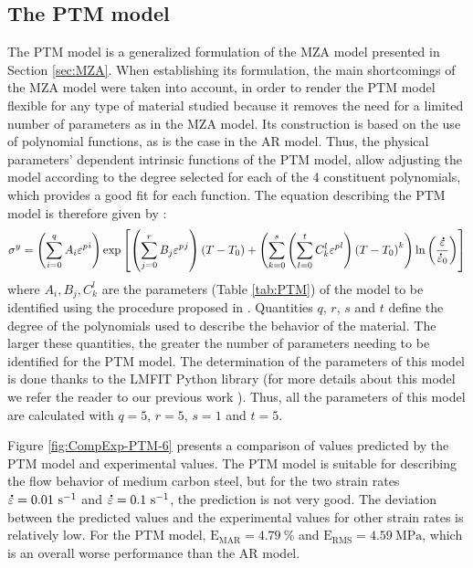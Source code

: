 \documentclass[metals,article,submit,pdftex,moreauthors]{Definitions/mdpi}
\DeclareRobustCommand{\mdot}[1]{\accentset{\mbox{\bfseries .}}{#1}}
\DeclareRobustCommand{\RMSE}{\text{E}_\text{RMS}}
\DeclareRobustCommand{\MARE}{\text{E}_\text{MAR}}
\DeclareRobustCommand{\ps}{\text{s}^{-1}}
\DeclareRobustCommand{\MPa}{\text{MPa}}
\begin{document}
\subsection{The PTM model\label{sec:PTM}}

The PTM model \cite{TizeMha-2022} is a generalized formulation of the MZA model presented in Section \ref{sec:MZA}.
When establishing its formulation, the main shortcomings of the MZA model were taken into account, in order to render the PTM model flexible for any type of material studied because it removes the need for a limited number of parameters as in the MZA model.
Its construction is based on the use of polynomial functions, as is the case in the AR model.
Thus, the physical parameters' dependent intrinsic functions of the PTM model, allow adjusting the model according to the degree selected for each of the 4 constituent polynomials, which provides a good fit for each function.
The equation describing the PTM model is therefore given by :
\begin{equation}
\label{eq:PTM-model}
\sigma^y = \left(\sum_{i=0}^{q}{A_i{\varepsilon^p}^{i}}\right) \exp\left[\left(\sum_{j=0}^{r}{B_j{\varepsilon^p}^{j}}\right)\left(T-T_0\right) + \left(\sum_{k=0}^{s}\left(\sum_{l=0}^{t}{C_k^l{\varepsilon^p}^{l}} \right)\left(T-T_0\right)^k \right)\ln\left( \frac{\mdot\varepsilon}{\mdot{\varepsilon}_0}\right)\right]
\end{equation}
where $A_i, B_j, C_k^l$ are the parameters (Table \ref{tab:PTM}) of the model to be identified using the procedure proposed in \cite{TizeMha-2022}.
Quantities $q$, $r$, $s$ and $t$ define the degree of the polynomials used to describe the behavior of the material.
The larger these quantities, the greater the number of parameters needing to be identified for the PTM model.
The determination of the parameters of this model is done thanks to the LMFIT Python library \cite{Newville-2016} (for more details about this model we refer the reader to our previous work \cite{TizeMha-2022}).
Thus, all the parameters of this model are calculated with $q=5$, $r=5$, $s=1$ and $t=5$.

Figure \ref{fig:CompExp-PTM-6} presents a comparison of values predicted by the PTM model and experimental values.
The PTM model is suitable for describing the flow behavior of medium carbon steel, but for the two strain rates $\mdot\varepsilon=0.01~\ps$ and $\mdot\varepsilon=0.1~\ps$, the prediction is not very good.
The deviation between the predicted values and the experimental values for other strain rates is relatively low.
For the PTM model, $\MARE=4.79~\%$ and $\RMSE=4.59~\MPa$, which is an overall worse performance than the AR model.
\end{document}
